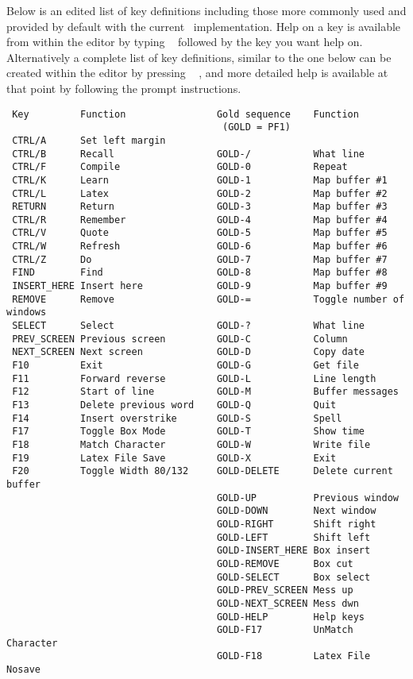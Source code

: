 Below is an edited list of key definitions including those more commonly used
and provided by default with the current \STEve\ implementation. Help on a key
is available from within the editor by typing \gold\  followed by
the key you want help on. Alternatively a complete list of key definitions,
similar to the one below can be created within the editor by pressing \gold\
 , and more detailed help is available at that point by following
the prompt instructions.
\begin{small}
\begin{verbatim}
 Key         Function                Gold sequence    Function
                                      (GOLD = PF1)
 CTRL/A      Set left margin
 CTRL/B      Recall                  GOLD-/           What line
 CTRL/F      Compile                 GOLD-0           Repeat
 CTRL/K      Learn                   GOLD-1           Map buffer #1
 CTRL/L      Latex                   GOLD-2           Map buffer #2
 RETURN      Return                  GOLD-3           Map buffer #3
 CTRL/R      Remember                GOLD-4           Map buffer #4
 CTRL/V      Quote                   GOLD-5           Map buffer #5
 CTRL/W      Refresh                 GOLD-6           Map buffer #6
 CTRL/Z      Do                      GOLD-7           Map buffer #7
 FIND        Find                    GOLD-8           Map buffer #8
 INSERT_HERE Insert here             GOLD-9           Map buffer #9
 REMOVE      Remove                  GOLD-=           Toggle number of windows
 SELECT      Select                  GOLD-?           What line
 PREV_SCREEN Previous screen         GOLD-C           Column
 NEXT_SCREEN Next screen             GOLD-D           Copy date
 F10         Exit                    GOLD-G           Get file
 F11         Forward reverse         GOLD-L           Line length
 F12         Start of line           GOLD-M           Buffer messages
 F13         Delete previous word    GOLD-Q           Quit
 F14         Insert overstrike       GOLD-S           Spell
 F17         Toggle Box Mode         GOLD-T           Show time
 F18         Match Character         GOLD-W           Write file
 F19         Latex File Save         GOLD-X           Exit
 F20         Toggle Width 80/132     GOLD-DELETE      Delete current buffer
                                     GOLD-UP          Previous window
                                     GOLD-DOWN        Next window
                                     GOLD-RIGHT       Shift right
                                     GOLD-LEFT        Shift left
                                     GOLD-INSERT_HERE Box insert
                                     GOLD-REMOVE      Box cut
                                     GOLD-SELECT      Box select
                                     GOLD-PREV_SCREEN Mess up
                                     GOLD-NEXT_SCREEN Mess dwn
                                     GOLD-HELP        Help keys
                                     GOLD-F17         UnMatch Character
                                     GOLD-F18         Latex File Nosave
\end{verbatim}
\end{small}

